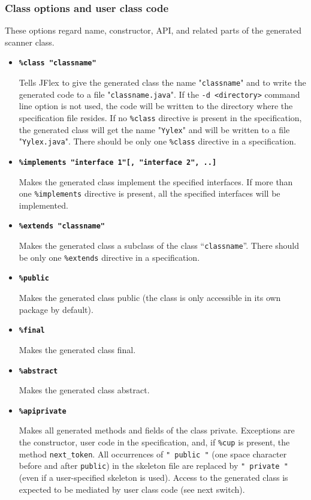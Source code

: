 \documentclass[11pt]{scrartcl}
\begin{document}
\subsubsection{Class options and user class code\label{ClassOptions}}
These options regard name, constructor, API, and related parts of the
generated scanner class.
\begin{itemize}
\item
{\bf \texttt{\%class "classname"}}

Tells JFlex to give the generated class the name "\texttt{classname}" and to
write the generated code to a file "\texttt{classname.java}". If the 
\texttt{-d <directory>} command line option is not used, the code
will be written to the directory where the specification file resides. If
no \texttt{\%class} directive is present in the specification, the generated
class will get the name "\texttt{Yylex}" and will be written to a file
"\texttt{Yylex.java}". There should be only one \texttt{\%class} directive
in a specification.
 
\item
{\bf \texttt{\%implements "interface 1"[, "interface 2", ..]}}

Makes the generated class implement the specified interfaces. If more than
one \texttt{\%imple\-ments} directive is present, all the specified interfaces 
will be implemented.
 
\item
{\bf \texttt{\%extends "classname"}}

Makes the generated class a subclass of the class ``\texttt{classname}''.
There should be only one \texttt{\%extends} directive in a specification.

\item
{\bf \texttt{\%public}}

Makes the generated class public (the class is only accessible in its
own package by default).

\item
{\bf \texttt{\%final}}

Makes the generated class final.

\item
{\bf \texttt{\%abstract}}

Makes the generated class abstract.
 
\item
{\bf \texttt{\%apiprivate}}

Makes all generated methods and fields of the class
private. Exceptions are the constructor, user code in the
specification, and, if \verb+%cup+ is present, the method
\texttt{next\_token}. All occurrences of
\texttt{" public "} (one space character before and after \texttt{public})
in the skeleton file are replaced by
\texttt{" private "} (even if a user-specified skeleton is used).
Access to the generated class is expected to be mediated by user class
code (see next switch).



\end{itemize}
\end{document}
